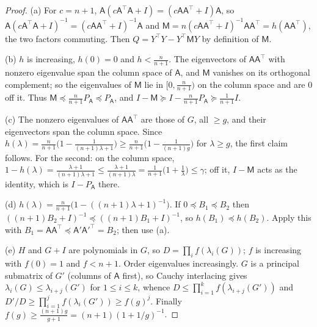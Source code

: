 \documentclass[11pt]{article}
\theoremstyle{remark}
\newcommand{\tr}{^{\top}}
\begin{document}
\begin{proof}
(a) For $c=n+1$, $\mathsf{A}(c\mathsf{A}\tr \mathsf{A}+I)=(c\mathsf{A}\mathsf{A}\tr+I)\mathsf{A}$, so $\mathsf{A}(c\mathsf{A}\tr \mathsf{A}+I)^{-1}=(c\mathsf{A}\mathsf{A}\tr+I)^{-1}\mathsf{A}$ and $\mathsf{M}=n(c\mathsf{A}\mathsf{A}\tr+I)^{-1}\mathsf{A}\mathsf{A}\tr=h(\mathsf{A}\mathsf{A}\tr)$, the two factors commuting. Then $Q=Y\tr Y-Y\tr \mathsf{M}Y$ by definition of $\mathsf{M}$.

(b) $h$ is increasing, $h(0)=0$ and $h<\frac n{n+1}$. The eigenvectors of $\mathsf{A}\mathsf{A}\tr$ with nonzero eigenvalue span the column space of $\mathsf{A}$, and $\mathsf{M}$ vanishes on its orthogonal complement; so the eigenvalues of $\mathsf{M}$ lie in $[0,\frac n{n+1})$ on the column space and are $0$ off it. Thus $\mathsf{M}\preceq\frac n{n+1}P_{\mathsf{A}}\preceq P_{\mathsf{A}}$, and $I-\mathsf{M}\succeq I-\frac n{n+1}P_{\mathsf{A}}\succeq\frac1{n+1}I$.

(c) The nonzero eigenvalues of $\mathsf{A}\mathsf{A}\tr$ are those of $G$, all $\ge g$, and their eigenvectors span the column space. Since $h(\lambda)=\frac n{n+1}\big(1-\frac1{(n+1)\lambda+1}\big)\ge\frac n{n+1}\big(1-\frac1{(n+1)g}\big)$ for $\lambda\ge g$, the first claim follows. For the second: on the column space, $1-h(\lambda)=\frac{\lambda+1}{(n+1)\lambda+1}\le\frac{\lambda+1}{(n+1)\lambda}=\frac1{n+1}\big(1+\frac1\lambda\big)\le\gamma$; off it, $I-\mathsf{M}$ acts as the identity, which is $I-P_{\mathsf{A}}$ there.

(d) $h(\lambda)=\frac n{n+1}\big(1-((n+1)\lambda+1)^{-1}\big)$. If $0\preceq B_1\preceq B_2$ then $((n+1)B_2+I)^{-1}\preceq((n+1)B_1+I)^{-1}$, so $h(B_1)\preceq h(B_2)$. Apply this with $B_1=\mathsf{A}\mathsf{A}\tr\preceq \mathsf{A}'\mathsf{A}'^{\top}=B_2$; then use (a).

(e) $H$ and $G+I$ are polynomials in $G$, so $D=\prod_if(\lambda_i(G))$; $f$ is increasing with $f(0)=1$ and $f<n+1$. Order eigenvalues increasingly. $G$ is a principal submatrix of $G'$ (columns of $\mathsf{A}$ first), so Cauchy interlacing gives $\lambda_i(G)\le\lambda_{i+j}(G')$ for $1\le i\le k$, whence $D\le\prod_{i=1}^kf(\lambda_{i+j}(G'))$ and
$D'/D\ge\prod_{i=1}^{j}f(\lambda_i(G'))\ge f(g)^j$. Finally $f(g)\ge\frac{(n+1)g}{g+1}=(n+1)(1+1/g)^{-1}$.
\end{proof}
\end{document}
